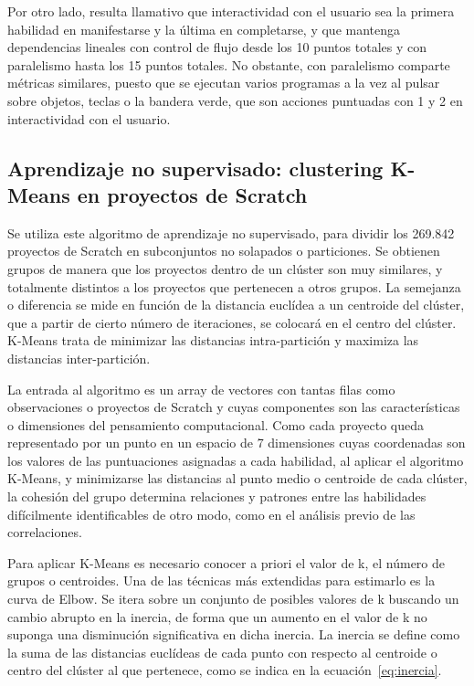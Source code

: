 \documentclass[a4paper, 12pt]{book}
\begin{document}
Por otro lado, resulta llamativo que interactividad con el usuario sea la primera habilidad en manifestarse y la última en completarse, y que mantenga dependencias lineales con control de flujo desde los 10 puntos totales y con paralelismo hasta los 15 puntos totales. No obstante, con paralelismo comparte métricas similares, puesto que se ejecutan varios programas a la vez al pulsar sobre objetos, teclas o la bandera verde, que son acciones puntuadas con 1 y 2 en interactividad con el usuario. 


\subsection{Aprendizaje no supervisado: clustering K-Means en proyectos de Scratch}
\label{subsec:kmeans_Scratch}

Se utiliza este algoritmo de aprendizaje no supervisado, para dividir los 269.842 proyectos de Scratch en subconjuntos no solapados o particiones. Se obtienen grupos de manera que los proyectos dentro de un clúster son muy similares, y totalmente distintos a los proyectos que pertenecen a otros grupos. La semejanza o diferencia se mide en función de la distancia euclídea a un centroide del clúster, que a partir de cierto número de iteraciones, se colocará en el centro del clúster. K-Means trata de minimizar las distancias intra-partición y maximiza las distancias inter-partición.

La entrada al algoritmo es un array de vectores con tantas filas como observaciones o proyectos de Scratch y cuyas componentes son las características o dimensiones del pensamiento computacional. Como cada proyecto queda representado por un punto en un espacio de 7 dimensiones cuyas coordenadas son los valores de las puntuaciones asignadas a cada habilidad, al aplicar el algoritmo K-Means, y minimizarse las distancias al punto medio o centroide de cada clúster, la cohesión del grupo determina relaciones y patrones entre las habilidades difícilmente identificables de otro modo, como en el análisis previo de las correlaciones. 

Para aplicar K-Means es necesario conocer a priori el valor de k, el número de grupos o centroides. Una de las técnicas más extendidas para estimarlo es la curva de Elbow. Se itera sobre un conjunto de posibles valores de k buscando un cambio abrupto en la inercia, de forma que un aumento en el valor de k no suponga una disminución significativa en dicha inercia. La inercia se define como la suma de las distancias euclídeas de cada punto con respecto al centroide o centro del clúster al que pertenece, como se indica en la ecuación~\eqref{eq:inercia}.
\end{document}
